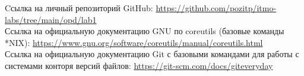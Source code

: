 \begin{thebibliography}{}
     Cсылка на личный репозиторий GitHub: \url{https://github.com/pozitp/itmo-labs/tree/main/opd/lab1}\\
     Ссылка на официальную документацию GNU по coreutils (базовые команды *NIX): \url{https://www.gnu.org/software/coreutils/manual/coreutils.html}\\
     Ссылка на официальную документацию Git с базовыми командами для работы с системами конторя версий файлов: \url{https://git-scm.com/docs/giteveryday}\\
\end{thebibliography}